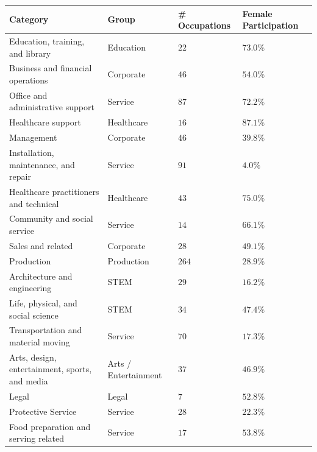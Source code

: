\documentclass[fleqn,10pt]{article}
\begin{document}
\begin{table}[H]
\begin{small}
	\centering
	\begin{tabular}{|m{3.5cm}|m{2.0cm}|m{2.5cm}|m{2.5cm}|}
	\hline	
	Category 										& Group 						& \# Occupations 	& Female Participation	\\ \hline \hline
	Education, training, and library 				& Education						& $22$ 				& $73.0\%$				\\ \hline
	Business and financial operations				& Corporate						& $46$ 				& $54.0\%$				\\ \hline
	Office and administrative support				& Service						& $87$ 				& $72.2\%$				\\ \hline
	Healthcare support 								& Healthcare					& $16$ 				& $87.1\%$				\\ \hline
	Management 										& Corporate						& $46$ 				& $39.8\%$				\\ \hline
	Installation, maintenance, and repair 			& Service						& $91$ 				& $4.0\%$ 				\\ \hline
	Healthcare practitioners and technical 			& Healthcare					& $43$ 				& $75.0\%$				\\ \hline
	Community and social service 					& Service						& $14$ 				& $66.1\%$				\\ \hline
	Sales and related 								& Corporate						& $28$ 				& $49.1\%$				\\ \hline
	Production 										& Production					& $264$ 			& $28.9\%$				\\ \hline
	Architecture and engineering 					& STEM 							& $29$ 				& $16.2\%$				\\ \hline
	Life, physical, and social science				& STEM 							& $34$ 				& $47.4\%$				\\ \hline
	Transportation and material moving				& Service						& $70$ 				& $17.3\%$				\\ \hline
	Arts, design, entertainment, sports, and media 	& Arts / Entertainment 			& $37$ 				& $46.9\%$				\\ \hline
	Legal											& Legal 						& $7$				& $52.8\%$				\\ \hline
	Protective Service 								& Service 						& $28$ 				& $22.3\%$				\\ \hline
	Food preparation and serving related 			& Service 						& $17$ 				& $53.8\%$				\\ \hline

\end{tabular}
\end{small}
\end{table}
\end{document}
